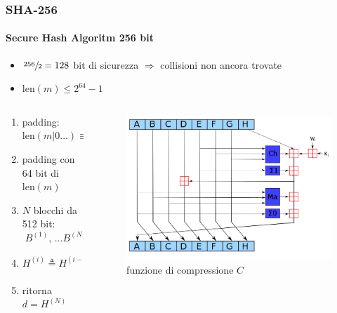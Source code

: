 \begin{frame}
	\frametitle{SHA-256}
	\framesubtitle{Secure Hash Algoritm 256 bit}
	
	\begin{itemize}	 
			\item $\sfrac{256}{2}=128$ bit di sicurezza $\Rightarrow$ collisioni non ancora trovate 
			\item $\mathrm{len}(m)\leq 2^{64}-1$
	\end{itemize}

	\begin{columns}
	 \begin{column}{.65\textwidth}
		\begin{enumerate}	 
		  	\item padding: $\mathrm{len}(m|0\dots)\equiv448\mod512$
			\item padding con 64 bit di $\mathrm{len}(m)$  
			\item $N$ blocchi da 512 bit: $\; B^{(1)},\,\dots B^{(N)} $
			\item $$ H^{(i)} \triangleq H^{(i-1)}+C_{B^{(i)}}(H^{(i-1)})$$
			\item ritorna $d=H^{(N)}$
		\end{enumerate}
	 \end{column}
	
	 \begin{column}{.55\textwidth}
	 	\begin{figure}
		 	\includegraphics[height = 4 cm]{images/sha2.png}
		 	\caption{funzione di compressione $C$}
	 	\end{figure}
	 \end{column}
	\end{columns}

\end{frame}